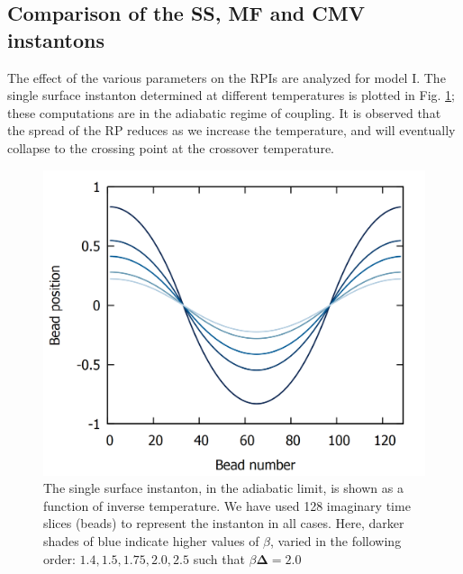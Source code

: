\documentclass[%
 aip,
 jmp,%
 amsmath,amssymb,
reprint,%
]{revtex4-1}
\begin{document}
\subsection{\label{ssec:level5B} Comparison of the SS, MF and CMV instantons}
The effect of the various parameters on the RPIs are analyzed for model I. The single surface instanton determined at different temperatures is plotted in Fig. \ref{fig:ins}; these computations are in the adiabatic regime of coupling. It is observed that the spread of the RP reduces as we increase the temperature, and will eventually collapse to the crossing point at the crossover temperature. 
\begin{figure}[ht!]
\centering
\includegraphics[scale=0.16]{adia-instantons-lines.png}
\caption{The single surface instanton, in the adiabatic limit, is shown as a function of inverse temperature. We have used 128 imaginary time slices (beads) to represent the instanton in all cases. Here, darker shades of blue indicate higher values of $\beta$, varied in the following order: $1.4, 1.5, 1.75, 2.0, 2.5$ such that $\beta\mathbf{\Delta}=2.0$ } \label{fig:ins}
\end{figure} \\
\end{document}
